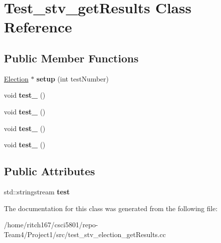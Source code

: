 \hypertarget{classTest__stv__getResults}{}\section{Test\+\_\+stv\+\_\+get\+Results Class Reference}
\label{classTest__stv__getResults}
\subsection*{Public Member Functions}
\begin{DoxyCompactItemize}
\item 
\mbox{\label{classTest__stv__getResults_a1b58278f3e648a6525ce49a5a0208095}} 
\hyperlink{classElection}{Election} $\ast$ {\bfseries setup} (int test\+Number)
\item 
\mbox{\label{classTest__stv__getResults_ae3cdb05653b6dc64767267517f7573f1}} 
void {\bfseries test\+\_} ()
\item 
\mbox{\label{classTest__stv__getResults_a98dc80d7506d0dc44efa8c7493a0647b}} 
void {\bfseries test\+\_} ()
\item 
\mbox{\label{classTest__stv__getResults_af91a602c621266c088894fcfcecd6c3c}} 
void {\bfseries test\+\_} ()
\item 
\mbox{\label{classTest__stv__getResults_a912fe177d1ce0f57bd047831e8e32b33}} 
void {\bfseries test\+\_} ()
\end{DoxyCompactItemize}
\subsection*{Public Attributes}
\begin{DoxyCompactItemize}
\item 
\mbox{\label{classTest__stv__getResults_ae0653cd44e43a6b7af074eef368c5cbb}} 
std\+::stringstream {\bfseries test}
\end{DoxyCompactItemize}


The documentation for this class was generated from the following file\+:\begin{DoxyCompactItemize}
\item 
/home/ritch167/csci5801/repo-\/\+Team4/\+Project1/src/test\+\_\+stv\+\_\+election\+\_\+get\+Results.\+cc\end{DoxyCompactItemize}
